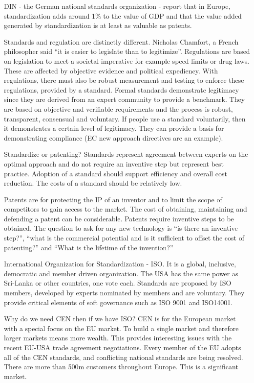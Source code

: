 DIN - the German national standards organization - report that in Europe, standardization adds around 1\% to the value of GDP and that the value added generated by standardization is at least as valuable as patents. 

Standards and regulation are distinctly different. Nicholas Chamfort, a French philosopher said ``it is easier to legislate than to legitimize''. 
Regulations are based on legislation to meet a societal imperative for example speed limits or drug laws. 
These are affected by objective evidence and political expediency. 
With regulations, there must also be robust measurement and testing to enforce these regulations, provided by a standard. 
Formal standards demonstrate legitimacy since they are derived from an expert community to provide a benchmark. 
They are based on objective and verifiable requirements and the process is robust, transparent, consensual and voluntary. 
If people use a standard voluntarily, then it demonstrates a certain level of legitimacy. 
They can provide a basis for demonstrating compliance (EC new approach directives are an example).

Standardize or patenting? 
Standards represent agreement between experts on the optimal approach and do not require an inventive step but represent best practice. 
Adoption of a standard should support efficiency and overall cost reduction. 
The costs of a standard should be relatively low. 

Patents are for protecting the IP of an inventor and to limit the scope of competitors to gain access to the market. 
The cost of obtaining, maintaining and defending a patent can be considerable. 
Patents require inventive steps to be obtained. 
The question to ask for any new technology is ``is there an inventive step?'', ``what is the commercial potential and is it sufficient to offset the cost of patenting?'' and ``What is the lifetime of the invention?''

International Organization for Standardization - ISO. It is a global, inclusive, democratic and member driven organization. The USA has the same power as Sri-Lanka or other countries, one vote each. Standards are proposed by ISO members, developed by experts nominated by members and are voluntary. They provide critical elements of soft governance such as ISO 9001 and ISO14001. 

Why do we need CEN then if we have ISO? 
CEN is for the European market with a special focus on the EU market. 
To build a single market and therefore larger markets means more wealth. 
This provides interesting issues with the recent EU-USA trade agreement negotiations.
 Every member of the EU adopts all of the CEN standards, and conflicting national standards are being resolved. 
There are more than 500m customers throughout Europe. 
This is a significant market. 

